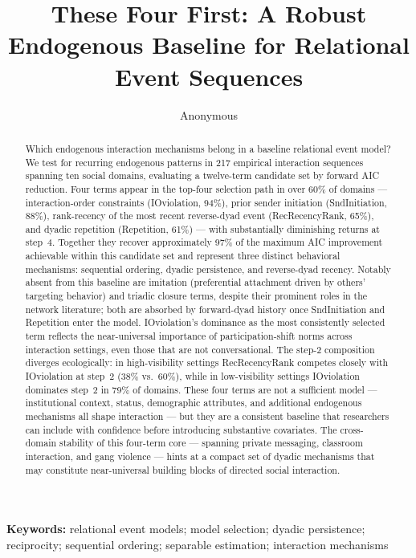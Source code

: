 \documentclass[11pt]{article}
\title{These Four First: A Robust Endogenous Baseline for Relational Event Sequences}
\author{Anonymous}
\begin{document}
\maketitle

\begin{abstract}
Which endogenous interaction mechanisms belong in a baseline relational event
model? We test for recurring endogenous patterns in 217 empirical interaction
sequences spanning ten social domains, evaluating a twelve-term candidate set
by forward AIC reduction. Four terms appear in the top-four
selection path in over 60\% of domains --- interaction-order constraints
(IOviolation, 94\%), prior sender initiation (SndInitiation, 88\%), rank-recency
of the most recent reverse-dyad event (RecRecencyRank, 65\%), and dyadic
repetition (Repetition, 61\%) --- with substantially diminishing returns at
step~4. Together they recover approximately 97\% of the maximum AIC improvement
achievable within this candidate set and represent three distinct behavioral
mechanisms: sequential ordering, dyadic persistence, and reverse-dyad recency.
Notably absent from this baseline are imitation (preferential attachment driven
by others' targeting behavior) and triadic closure terms, despite their
prominent roles in the network literature; both are absorbed by forward-dyad
history once SndInitiation and Repetition enter the model.
IOviolation's dominance as the most consistently selected term reflects the
near-universal importance of participation-shift norms across interaction
settings, even those that are not conversational. The step-2 composition
diverges ecologically: in high-visibility settings RecRecencyRank competes
closely with IOviolation at step~2 (38\% vs.\ 60\%), while in low-visibility
settings IOviolation dominates step~2 in 79\% of domains. These four terms are
not a sufficient model --- institutional context, status, demographic attributes,
and additional endogenous mechanisms all shape interaction --- but they are a
consistent baseline that researchers can include with confidence before
introducing substantive covariates. The cross-domain stability of this four-term
core --- spanning private messaging, classroom interaction, and gang violence ---
hints at a compact set of dyadic mechanisms that may constitute near-universal
building blocks of directed social interaction.
\end{abstract}

\noindent\textbf{Keywords:} relational event models; model selection; dyadic persistence;
reciprocity; sequential ordering; separable estimation; interaction mechanisms
\end{document}
